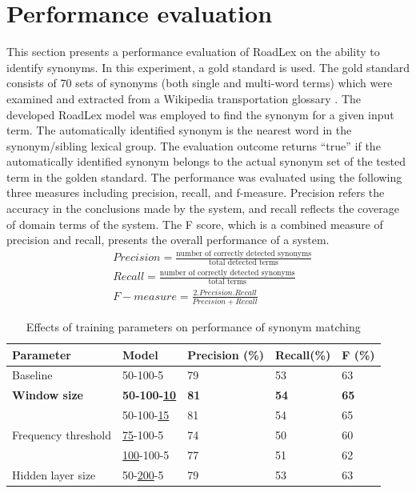 \documentclass[Journal, BackFigs, DoubleSpace]{ascelike}%
\begin{document}
\section{Performance evaluation} \label{sec:eval_RoadLex}
This section presents a performance evaluation of RoadLex on the ability to identify synonyms. In this experiment, a gold standard  is used. The gold standard consists of 70 sets of synonyms (both single and multi-word terms) which were examined and extracted from a Wikipedia transportation glossary \cite{wikipedia16}. The developed RoadLex model was employed to find the synonym for a given input term. The automatically identified synonym is the nearest word in the synonym/sibling lexical group. The evaluation outcome returns ``true'' if the automatically identified synonym belongs to the actual synonym set of the tested term in the golden standard. The performance was evaluated using the following three measures including precision, recall, and f-measure. Precision refers the accuracy in the conclusions made by the system, and recall reflects the coverage of domain terms of the system. The F score, which is a combined measure of precision and recall, presents the overall performance of a system. 
%
\begin{align} 
&Precision = \frac{\text{number of correctly detected synonyms}}{\text{total detected terms}}  \\
&Recall = \frac{\text{number of correctly detected synonyms}}{\text{total terms}}  \\ 
&F-measure = \frac{2.Precision.Recall}{Precision+Recall}
\end{align}
\begin{table} [b] 
	\caption{Effects of training parameters on performance of synonym matching}
	\label{table:eval_syn_par_effect}
	\centering
	\small
	\renewcommand{\arraystretch}{1.25}
	\begin{tabular}{l l l l l }
		\hline
		\hline
		\textbf{Parameter} & \textbf{Model} & \textbf{Precision (\%)}  & \textbf{Recall(\%)} & \textbf{F (\%)}\\
		\hline
		Baseline	&	50-100-5	&79		&53		&63\\
		\hline
		\textbf{Window size}	&\textbf{50-100-\underline{10}}	&\textbf{81}		&\textbf{54}		&\textbf{65}\\
		&50-100-\underline{15}	&81		&54		&65\\
		\hline		
		Frequency threshold	&\underline{75}-100-5	&74		&50		&60\\
		&\underline{100}-100-5	&77		&51		&62\\
		\hline
		Hidden layer size	&50-\underline{200}-5	&79		&53		&63\\
		\hline
		\hline
	\end{tabular}
	\normalsize
\end{table}
\end{document}
